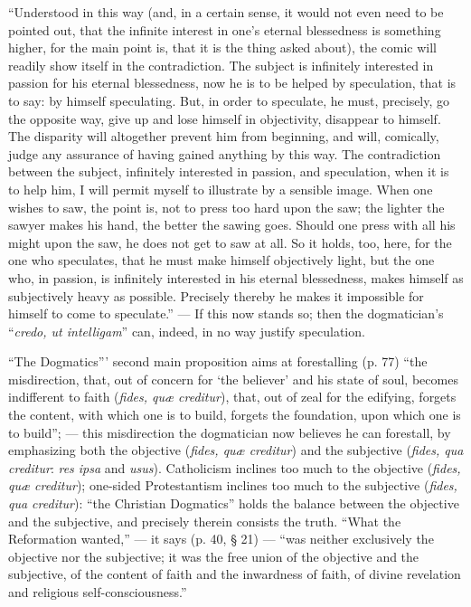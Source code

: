 \documentclass[12pt]{book}
\begin{document}
``Understood in this way (and, in a certain sense, it would not even need to be pointed out, that the infinite interest in one's eternal blessedness is something higher, for the main point is, that it is the thing asked about), the comic will readily show itself in the contradiction. The subject is infinitely interested in passion for his eternal blessedness, now he is to be helped by speculation, that is to say: by himself speculating. But, in order to speculate, he must, precisely, go the opposite way, give up and lose himself in objectivity, disappear to himself. The disparity will altogether prevent him from beginning, and will, comically, judge any assurance of having gained anything by this way. The contradiction between the subject, infinitely interested in passion, and speculation, when it is to help him, I will permit myself to illustrate by a sensible image. When one wishes to saw, the point is, not to press too hard upon the saw; the lighter the sawyer makes his hand, the better the sawing goes. Should one press with all his might
upon the saw, he does not get to saw at all. So it holds, too, here, for the one who speculates, that he must make himself objectively light, but the one who, in passion, is infinitely interested in his eternal blessedness, makes himself as subjectively heavy as possible. Precisely thereby he makes it impossible for himself to come to speculate.'' --- If this now stands so; then the dogmatician's ``\textit{credo, ut intelligam}'' can, indeed, in no way justify speculation.

``The Dogmatics''' second main proposition aims at forestalling (p. 77) ``the misdirection, that, out of concern for `the believer' and his state of soul, becomes indifferent to faith (\textit{fides, quæ creditur}), that, out of zeal for the edifying, forgets the content, with which one is to build, forgets the foundation, upon which one is to build''; --- this misdirection the dogmatician now believes he can forestall, by emphasizing both the objective (\textit{fides, quæ creditur}) and the subjective (\textit{fides, qua creditur}: \textit{res ipsa} and \textit{usus}). Catholicism inclines too much to the objective (\textit{fides, quæ creditur}); one-sided Protestantism inclines too much to the subjective (\textit{fides, qua creditur}): ``the Christian Dogmatics'' holds the balance between the objective and the subjective, and precisely therein consists the truth. ``What the Reformation wanted,'' --- it says (p. 40, § 21) --- ``was neither exclusively the objective nor the subjective; it was the free union of the objective and the subjective, of the content of faith and the inwardness of faith, of divine revelation and religious self-consciousness.''
\end{document}
